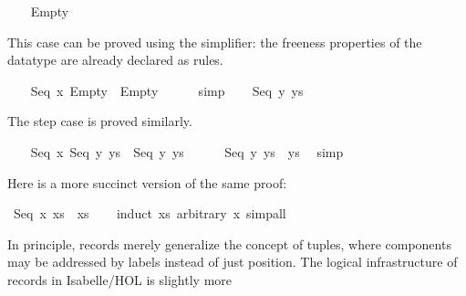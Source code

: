 \begin{isabellebody}
\ \ \isamarkupfalse%
\ Empty%
\begin{isamarkuptxt}%
This case can be proved using the simplifier: the freeness
    properties of the datatype are already declared as \hyperlink{attribute.simp}{\mbox{}} rules.%
\end{isamarkuptxt}%
\isamarkuptrue%
\ \ \isamarkupfalse%
\ {}Seq\ x\ Empty\ {}\ Empty{}\isanewline
\ \ \ \ \isamarkupfalse%
\ simp\isanewline
{}\isamarkupfalse%
\isanewline
\ \ \isamarkupfalse%
\ {}Seq\ y\ ys{}%
\begin{isamarkuptxt}%
The step case is proved similarly.%
\end{isamarkuptxt}%
\isamarkuptrue%
\ \ \isamarkupfalse%
\ {}Seq\ x\ {}Seq\ y\ ys{}\ {}\ Seq\ y\ ys{}\isanewline
\ \ \ \ \isamarkupfalse%
\ {}Seq\ y\ ys\ {}\ ys{}\ \isamarkupfalse%
\ simp\isanewline
{}\isamarkupfalse%
%
\endisatagproof
{\isafoldproof}%
%
\isadelimproof
%
\endisadelimproof
%
\begin{isamarkuptext}%
Here is a more succinct version of the same proof:%
\end{isamarkuptext}%
\isamarkuptrue%
\isamarkupfalse%
\ {}Seq\ x\ xs\ {}\ xs{}\isanewline
%
\isadelimproof
\ \ %
\endisadelimproof
%
\isatagproof
{}\isamarkupfalse%
\ {}induct\ xs\ arbitrary{}\ x{}\ simp{}all%
\endisatagproof
{\isafoldproof}%
%
\isadelimproof
%
\endisadelimproof
%
\isamarkuptrue%
%
\begin{isamarkuptext}%
In principle, records merely generalize the concept of tuples, where
  components may be addressed by labels instead of just position.  The
  logical infrastructure of records in Isabelle/HOL is slightly more

\end{isamarkuptext}
\end{isabellebody}
